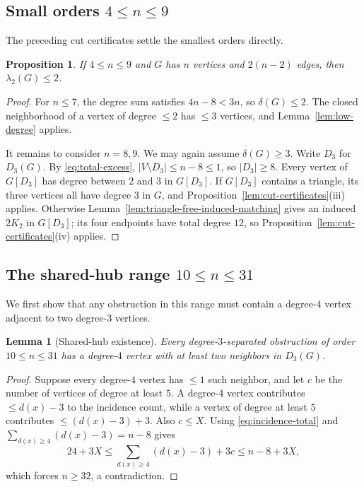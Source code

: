 \documentclass[11pt]{article}
\numberwithin{equation}{section}
\newtheorem{lemma}[theorem]{Lemma}
\newtheorem{proposition}[theorem]{Proposition}
\theoremstyle{definition}
\theoremstyle{remark}
\newcommand{\ac}{\lambda_2}
\begin{document}
\subsection{Small orders \texorpdfstring{\(4\le n\le9\)}{4 <= n <= 9}}

The preceding cut certificates settle the smallest orders directly.

\begin{proposition}\label{prop:orders-4-9}
If \(4\le n\le9\) and \(G\) has \(n\) vertices and \(2(n-2)\) edges, then
\(\ac(G)\le2\).
\end{proposition}

\begin{proof}
For \(n\le7\), the degree sum satisfies \(4n-8<3n\), so
\(\delta(G)\le2\).  The closed neighborhood of a vertex of degree
\(\le2\) has \(\le3\) vertices, and Lemma~\ref{lem:low-degree}
applies.

It remains to consider \(n=8,9\).  We may again assume
\(\delta(G)\ge3\).  Write \(D_3\) for \(D_3(G)\).  By
\eqref{eq:total-excess},
\(|V\setminus D_3|\le n-8\le1\), so \(|D_3|\ge8\).  Every vertex of
\(G[D_3]\) has degree between \(2\) and \(3\) in \(G[D_3]\).  If
\(G[D_3]\) contains a triangle, its three
vertices all have degree \(3\) in \(G\), and
Proposition~\ref{lem:cut-certificates}(iii) applies.  Otherwise
Lemma~\ref{lem:triangle-free-induced-matching} gives an induced
\(2K_2\) in \(G[D_3]\); its four endpoints have total degree \(12\), so
Proposition~\ref{lem:cut-certificates}(iv) applies.
\end{proof}

\subsection{The shared-hub range \texorpdfstring{\(10\le n\le31\)}{10 <= n <= 31}}

We first show that any obstruction in this range must contain a degree-\(4\)
vertex adjacent to two degree-\(3\) vertices.

\begin{lemma}[Shared-hub existence]\label{lem:shared-hub-existence}
Every degree-\(3\)-separated obstruction of order \(10\le n\le31\)
has a degree-\(4\) vertex with at least two neighbors in \(D_3(G)\).
\end{lemma}

\begin{proof}
Suppose every degree-\(4\) vertex has \(\le1\) such neighbor, and let
\(c\) be the number of vertices of degree at least \(5\).  A degree-\(4\)
vertex contributes \(\le d(x)-3\) to the incidence count, while a
vertex of degree at least \(5\) contributes \(\le(d(x)-3)+3\).
Also \(c\le X\).  Using
\eqref{eq:incidence-total} and
\(\sum_{d(x)\ge4}(d(x)-3)=n-8\) gives
\[
 24+3X
 \le\sum_{d(x)\ge4}(d(x)-3)+3c
 \le n-8+3X,
\]
which forces \(n\ge32\), a contradiction.
\end{proof}
\end{document}
